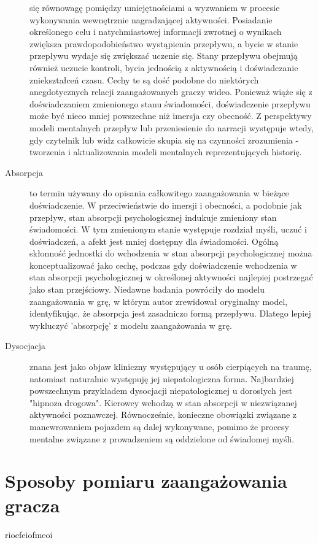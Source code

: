 \begin{description}
          się równowagę pomiędzy umiejętnościami a wyzwaniem w procesie wykonywania wewnętrznie nagradzającej
          aktywności\cite{development_of_game}. Posiadanie określonego celu i natychmiastowej informacji zwrotnej o wynikach zwiększa
          prawdopodobieństwo wystąpienia przepływu, a bycie w stanie przepływu wydaje się zwiększać uczenie
          się. Stany przepływu obejmują również uczucie kontroli, bycia jednością z aktywnością i doświadczanie
          zniekształceń czasu. Cechy te są dość podobne do niektórych anegdotycznych relacji zaangażowanych
          graczy wideo. Ponieważ wiąże się z doświadczaniem zmienionego stanu świadomości, doświadczenie
          przepływu może być nieco mniej powszechne niż imersja czy obecność\cite{development_of_game}. Z perspektywy modeli mentalnych
          przepływ lub przeniesienie do narracji występuje wtedy, gdy czytelnik lub widz całkowicie skupia się
          na czynności zrozumienia - tworzenia i aktualizowania modeli mentalnych reprezentujących historię\cite{measuring_narrative}.
    \item[Absorpcja] to termin używany do opisania całkowitego zaangażowania w bieżące doświadczenie. W
          przeciwieństwie do imersji i obecności, a podobnie jak przepływ, stan absorpcji psychologicznej
          indukuje zmieniony stan świadomości\cite{development_of_game}. W tym zmienionym stanie występuje rozdział myśli, uczuć i
          doświadczeń, a afekt jest mniej dostępny dla świadomości. Ogólną skłonność jednostki do wchodzenia
          w stan absorpcji psychologicznej można konceptualizować jako cechę, podczas gdy doświadczenie
          wchodzenia w stan absorpcji psychologicznej w określonej aktywności najlepiej postrzegać jako stan
          przejściowy\cite{development_of_game}. Niedawne badania powróciły do modelu zaangażowania w grę, w którym autor zrewidował
          oryginalny model, identyfikując, że absorpcja jest zasadniczo formą przepływu. Dlatego lepiej
          wykluczyć 'absorpcję' z modelu zaangażowania w grę\cite{eng_in_games}.
    \item[Dysocjacja] znana jest jako objaw kliniczny występujący u osób cierpiących na traumę, natomiast
          naturalnie występuję jej niepatologiczna forma\cite{development_of_game}. Najbardziej powszechnym przykładem dysocjacji
          niepatologicznej u dorosłych jest "hipnoza drogowa". Kierowcy wchodzą w stan absorpcji w
          niezwiązanej aktywności poznawczej. Równocześnie, konieczne obowiązki związane z manewrowaniem
          pojazdem są dalej wykonywane, pomimo że procesy mentalne związane z prowadzeniem są oddzielone
          od świadomej myśli\cite{development_of_game}.
\end{description}

\section{Sposoby pomiaru zaangażowania gracza}\label{section:ch3_2}

rioefeiofmeoi